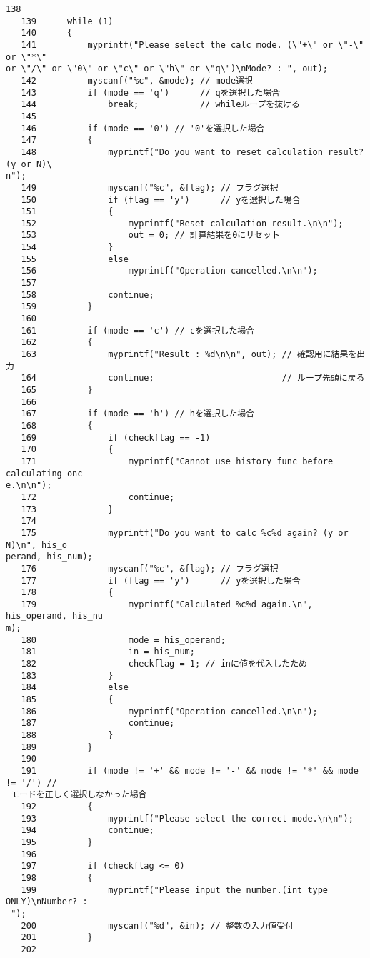 \begin{Verbatim}[fontsize=\small, baselinestretch=0.8]
   138	
   139	    while (1)
   140	    {
   141	        myprintf("Please select the calc mode. (\"+\" or \"-\" or \"*\" 
or \"/\" or \"0\" or \"c\" or \"h\" or \"q\")\nMode? : ", out);
   142	        myscanf("%c", &mode); // mode選択
   143	        if (mode == 'q')      // qを選択した場合
   144	            break;            // whileループを抜ける
   145	
   146	        if (mode == '0') // '0'を選択した場合
   147	        {
   148	            myprintf("Do you want to reset calculation result? (y or N)\
n");
   149	            myscanf("%c", &flag); // フラグ選択
   150	            if (flag == 'y')      // yを選択した場合
   151	            {
   152	                myprintf("Reset calculation result.\n\n");
   153	                out = 0; // 計算結果を0にリセット
   154	            }
   155	            else
   156	                myprintf("Operation cancelled.\n\n");
   157	
   158	            continue;
   159	        }
   160	
   161	        if (mode == 'c') // cを選択した場合
   162	        {
   163	            myprintf("Result : %d\n\n", out); // 確認用に結果を出力
   164	            continue;                         // ループ先頭に戻る
   165	        }
   166	
   167	        if (mode == 'h') // hを選択した場合
   168	        {
   169	            if (checkflag == -1)
   170	            {
   171	                myprintf("Cannot use history func before calculating onc
e.\n\n");
   172	                continue;
   173	            }
   174	
   175	            myprintf("Do you want to calc %c%d again? (y or N)\n", his_o
perand, his_num);
   176	            myscanf("%c", &flag); // フラグ選択
   177	            if (flag == 'y')      // yを選択した場合
   178	            {
   179	                myprintf("Calculated %c%d again.\n", his_operand, his_nu
m);
   180	                mode = his_operand;
   181	                in = his_num;
   182	                checkflag = 1; // inに値を代入したため
   183	            }
   184	            else
   185	            {
   186	                myprintf("Operation cancelled.\n\n");
   187	                continue;
   188	            }
   189	        }
   190	
   191	        if (mode != '+' && mode != '-' && mode != '*' && mode != '/') //
 モードを正しく選択しなかった場合
   192	        {
   193	            myprintf("Please select the correct mode.\n\n");
   194	            continue;
   195	        }
   196	
   197	        if (checkflag <= 0)
   198	        {
   199	            myprintf("Please input the number.(int type ONLY)\nNumber? :
 ");
   200	            myscanf("%d", &in); // 整数の入力値受付
   201	        }
   202	

\end{Verbatim}
